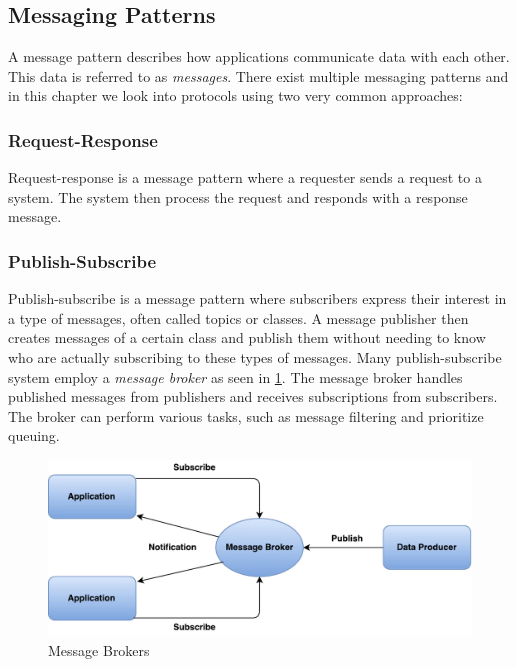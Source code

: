 \subsection{Messaging Patterns}

A message pattern describes how applications communicate data with each other.
This data is referred to as \textit{messages}. There exist multiple messaging
patterns and in this chapter we look into protocols using two very common
approaches:

\subsubsection{Request-Response}

Request-response is a message pattern where a requester sends a request to a
system. The system then process the request and responds with a response
message.

\subsubsection{Publish-Subscribe}

Publish-subscribe is a message pattern where subscribers express their interest
in a type of messages, often called topics or classes. A message publisher then
creates messages of a certain class and publish them without needing to know who
are actually subscribing to these types of messages. Many publish-subscribe
system employ a \textit{message broker} as seen in
\cref{figure-message-brokers}. The message broker handles published messages
from publishers and receives subscriptions from subscribers. The broker can
perform various tasks, such as message filtering and prioritize queuing.

\begin{figure}[h]
\centering
\includegraphics[scale=0.6]{images/pubsub.pdf}
\caption{Message Brokers}
\label{figure-message-brokers}
\end{figure}



